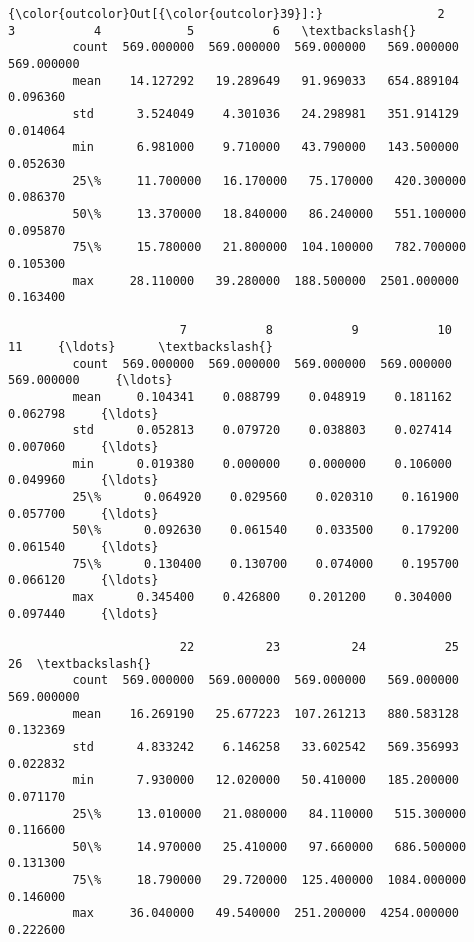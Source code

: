 \documentclass[11pt]{article}
\begin{document}
\begin{Verbatim}[commandchars=\\\{\}]
{\color{outcolor}Out[{\color{outcolor}39}]:}                2           3           4            5           6   \textbackslash{}
         count  569.000000  569.000000  569.000000   569.000000  569.000000   
         mean    14.127292   19.289649   91.969033   654.889104    0.096360   
         std      3.524049    4.301036   24.298981   351.914129    0.014064   
         min      6.981000    9.710000   43.790000   143.500000    0.052630   
         25\%     11.700000   16.170000   75.170000   420.300000    0.086370   
         50\%     13.370000   18.840000   86.240000   551.100000    0.095870   
         75\%     15.780000   21.800000  104.100000   782.700000    0.105300   
         max     28.110000   39.280000  188.500000  2501.000000    0.163400   
         
                        7           8           9           10          11     {\ldots}      \textbackslash{}
         count  569.000000  569.000000  569.000000  569.000000  569.000000     {\ldots}       
         mean     0.104341    0.088799    0.048919    0.181162    0.062798     {\ldots}       
         std      0.052813    0.079720    0.038803    0.027414    0.007060     {\ldots}       
         min      0.019380    0.000000    0.000000    0.106000    0.049960     {\ldots}       
         25\%      0.064920    0.029560    0.020310    0.161900    0.057700     {\ldots}       
         50\%      0.092630    0.061540    0.033500    0.179200    0.061540     {\ldots}       
         75\%      0.130400    0.130700    0.074000    0.195700    0.066120     {\ldots}       
         max      0.345400    0.426800    0.201200    0.304000    0.097440     {\ldots}       
         
                        22          23          24           25          26  \textbackslash{}
         count  569.000000  569.000000  569.000000   569.000000  569.000000   
         mean    16.269190   25.677223  107.261213   880.583128    0.132369   
         std      4.833242    6.146258   33.602542   569.356993    0.022832   
         min      7.930000   12.020000   50.410000   185.200000    0.071170   
         25\%     13.010000   21.080000   84.110000   515.300000    0.116600   
         50\%     14.970000   25.410000   97.660000   686.500000    0.131300   
         75\%     18.790000   29.720000  125.400000  1084.000000    0.146000   
         max     36.040000   49.540000  251.200000  4254.000000    0.222600   
         

\end{Verbatim}
\end{document}
